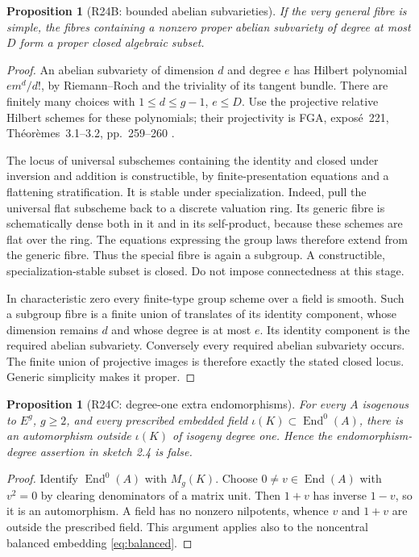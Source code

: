 \documentclass[11pt,a4paper]{article}
\newtheorem{proposition}[theorem]{Proposition}
\theoremstyle{definition}\newtheorem{definition}[theorem]{Definition}
\theoremstyle{remark}\newtheorem{remark}[theorem]{Remark}
\newcommand{\End}{\operatorname{End}}\newcommand{\NS}{\operatorname{NS}}\newcommand{\Hom}{\operatorname{Hom}}
\begin{document}
\begin{proposition}[R24B: bounded abelian subvarieties]\label{R24B}
If the very general fibre is simple, the fibres containing a nonzero proper abelian subvariety of degree at most $D$ form a proper closed algebraic subset.
\end{proposition}
\begin{proof}
An abelian subvariety of dimension $d$ and degree $e$ has Hilbert polynomial $em^d/d!$, by Riemann--Roch and the triviality of its tangent bundle. There are finitely many choices with $1\le d\le g-1$, $e\le D$. Use the projective relative Hilbert schemes for these polynomials; their projectivity is FGA, expos\'e~221, Th\'eor\`emes~3.1--3.2, pp.~259--260 \citep{FGA}.

The locus of universal subschemes containing the identity and closed under inversion and addition is constructible, by finite-presentation equations and a flattening stratification. It is stable under specialization. Indeed, pull the universal flat subscheme back to a discrete valuation ring. Its generic fibre is schematically dense both in it and in its self-product, because these schemes are flat over the ring. The equations expressing the group laws therefore extend from the generic fibre. Thus the special fibre is again a subgroup. A constructible, specialization-stable subset is closed. Do not impose connectedness at this stage.

In characteristic zero every finite-type group scheme over a field is smooth. Such a subgroup fibre is a finite union of translates of its identity component, whose dimension remains $d$ and whose degree is at most $e$. Its identity component is the required abelian subvariety. Conversely every required abelian subvariety occurs. The finite union of projective images is therefore exactly the stated closed locus. Generic simplicity makes it proper.
\end{proof}

\begin{proposition}[R24C: degree-one extra endomorphisms]\label{R24C}
For every $A$ isogenous to $E^g$, $g\ge2$, and every prescribed embedded field $\iota(K)\subset\End^0(A)$, there is an automorphism outside $\iota(K)$ of isogeny degree one. Hence the endomorphism-degree assertion in sketch 2.4 is false.
\end{proposition}
\begin{proof}
Identify $\End^0(A)$ with $M_g(K)$. Choose $0\ne v\in\End(A)$ with $v^2=0$ by clearing denominators of a matrix unit. Then $1+v$ has inverse $1-v$, so it is an automorphism. A field has no nonzero nilpotents, whence $v$ and $1+v$ are outside the prescribed field. This argument applies also to the noncentral balanced embedding \eqref{eq:balanced}.
\end{proof}
\end{document}
